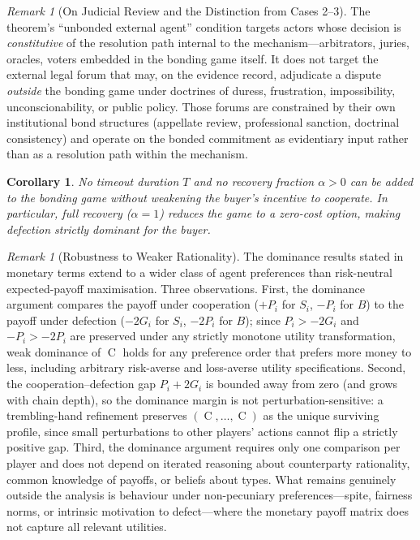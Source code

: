 \documentclass[11pt,a4paper]{article}
\newtheorem{corollary}[theorem]{Corollary}
\theoremstyle{definition}
\theoremstyle{remark}
\newtheorem{remark}[theorem]{Remark}
\newcommand{\pay}{P}           %
\newcommand{\cumval}{G}        %
\DeclareMathOperator{\Coop}{C}
\begin{document}
\begin{remark}[On Judicial Review and the Distinction from Cases 2--3]
\label{rem:judicial-review}
The theorem's ``unbonded external agent'' condition targets actors
whose decision is \emph{constitutive} of the resolution path
internal to the mechanism---arbitrators, juries, oracles, voters
embedded in the bonding game itself. It does not target the
external legal forum that may, on the evidence record, adjudicate
a dispute \emph{outside} the bonding game under doctrines of
duress, frustration, impossibility, unconscionability, or public
policy. Those forums are constrained by their own institutional
bond structures (appellate review, professional sanction, doctrinal
consistency) and operate on the bonded commitment as evidentiary
input rather than as a resolution path within the mechanism.
\end{remark}

\begin{corollary}\label{cor:no-timeout}
No timeout duration $T$ and no recovery fraction $\alpha > 0$ can be
added to the bonding game without weakening the buyer's incentive to
cooperate. In particular, full recovery ($\alpha = 1$) reduces the
game to a zero-cost option, making defection strictly dominant for
the buyer.
\end{corollary}

\begin{remark}[Robustness to Weaker Rationality]
\label{rem:bounded-rationality}
The dominance results stated in monetary terms extend to a wider
class of agent preferences than risk-neutral expected-payoff
maximisation. Three observations.
First, the dominance argument compares the payoff under cooperation
($+\pay_i$ for $S_i$, $-\pay_i$ for $B$) to the payoff under
defection ($-2\cumval_i$ for $S_i$, $-2\pay_i$ for $B$); since
$\pay_i > -2\cumval_i$ and $-\pay_i > -2\pay_i$ are preserved under
any strictly monotone utility transformation, weak dominance of
$\Coop$ holds for any preference order that prefers more money to
less, including arbitrary risk-averse and loss-averse utility
specifications.
Second, the cooperation--defection gap $\pay_i + 2\cumval_i$ is
bounded away from zero (and grows with chain depth), so the
dominance margin is not perturbation-sensitive: a trembling-hand
refinement preserves $(\Coop, \ldots, \Coop)$ as the unique
surviving profile, since small perturbations to other players'
actions cannot flip a strictly positive gap.
Third, the dominance argument requires only one comparison per
player and does not depend on iterated reasoning about counterparty
rationality, common knowledge of payoffs, or beliefs about types.
What remains genuinely outside the analysis is behaviour under
non-pecuniary preferences---spite, fairness norms, or intrinsic
motivation to defect---where the monetary payoff matrix does not
capture all relevant utilities.
\end{remark}
\end{document}
